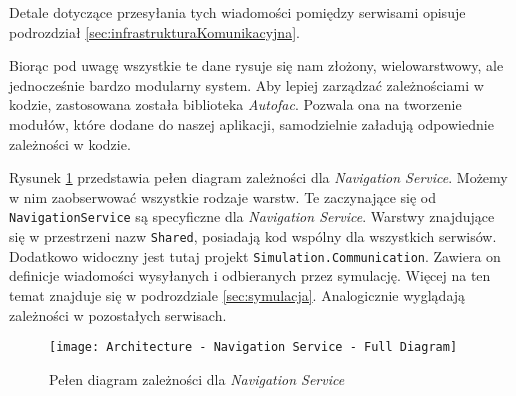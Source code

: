 \par Detale dotyczące przesyłania tych wiadomości pomiędzy serwisami opisuje podrozdział \ref{sec:infrastrukturaKomunikacyjna}.

\par Biorąc pod uwagę wszystkie te dane rysuje się nam złożony, wielowarstwowy, ale jednocześnie bardzo modularny system. Aby lepiej zarządzać zależnościami w kodzie, zastosowana została biblioteka \emph{Autofac}\cite{AUTOFAC_SITE}. Pozwala ona na tworzenie modułów, które dodane do naszej aplikacji, samodzielnie załadują odpowiednie zależności w kodzie.

\par Rysunek \ref{fig:architectureNavigationServiceFullDiagram} przedstawia pełen diagram zależności dla \emph{Navigation Service}. Możemy w nim zaobserwować wszystkie rodzaje warstw. Te zaczynające się od \texttt{NavigationService} są specyficzne dla \emph{Navigation Service}. Warstwy znajdujące się w przestrzeni nazw \texttt{Shared}, posiadają kod wspólny dla wszystkich serwisów. Dodatkowo widoczny jest tutaj projekt \texttt{Simulation.Communication}. Zawiera on definicje wiadomości wysyłanych i odbieranych przez symulację. Więcej na ten temat znajduje się w podrozdziale \ref{sec:symulacja}. Analogicznie wyglądają zależności w pozostałych serwisach.

\begin{figure}
    \centering
    \texttt{[image: Architecture - Navigation Service - Full Diagram]}
    \caption{Pełen diagram zależności dla \emph{Navigation Service}}
    \label{fig:architectureNavigationServiceFullDiagram}
\end{figure}